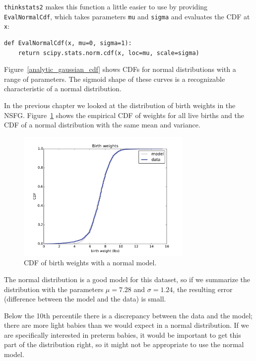 \documentclass[12pt]{book}
\begin{document}
{\tt thinkstats2} makes this function a little easier to use
by providing {\tt EvalNormalCdf}, which takes parameters {\tt mu}
and {\tt sigma} and evaluates the CDF at {\tt x}:

\begin{verbatim}
def EvalNormalCdf(x, mu=0, sigma=1):
    return scipy.stats.norm.cdf(x, loc=mu, scale=sigma)
\end{verbatim}

Figure~\ref{analytic_gaussian_cdf} shows CDFs for normal
distributions with a range of parameters.  The sigmoid shape of these
curves is a recognizable characteristic of a normal distribution.

In the previous chapter we looked at the distribution of birth
weights in the NSFG.  Figure~\ref{analytic_birthwgt_model} shows the
empirical CDF of weights for all live births and the CDF of
a normal distribution with the same mean and variance.

\begin{figure}
\centerline{\includegraphics[height=2.5in]{figs/analytic_birthwgt_model.pdf}}
\caption{CDF of birth weights with a normal model.}
\label{analytic_birthwgt_model}
\end{figure}

The normal distribution is a good model for this dataset, so
if we summarize the distribution with the parameters
$\mu = 7.28$ and $\sigma = 1.24$, the resulting error
(difference between the model and the data) is small.

Below the 10th percentile there is a discrepancy between the data
and the model; there are more light babies than we would expect in
a normal distribution.  If we are specifically interested in preterm
babies, it would be important to get this part of the distribution
right, so it might not be appropriate to use the normal
model.
\end{document}
